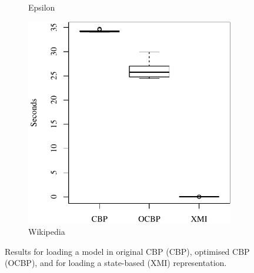 \documentclass{beamer}
\begin{document}
\begin{frame}[fragile]
\begin{figure}[ht]
\begin{subfigure}{0.325\textwidth}
        \caption{Epsilon}
        \label{fig:load_time_epsilon}
    \end{subfigure}
    \hfill
    \begin{subfigure}{0.325\textwidth}
        \centering
        \includegraphics[width=\linewidth]{load_time_wikipedia}
        \caption{Wikipedia}
        \label{fig:load_time_wikipedia}
    \end{subfigure}
    \caption{Results for loading a model in original CBP (CBP), optimised CBP (OCBP), and for loading a state-based (XMI) representation.}
    \label{fig:loadtime}
\end{figure}
\end{frame}
\end{document}

